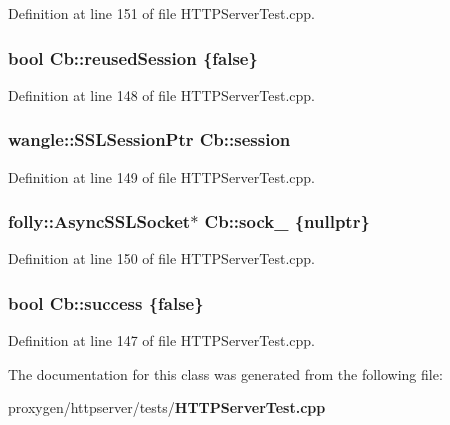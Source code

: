 Definition at line 151 of file H\+T\+T\+P\+Server\+Test.\+cpp.

\subsubsection[{reused\+Session}]{\setlength{\rightskip}{0pt plus 5cm}bool Cb\+::reused\+Session \{false\}}\label{classCb_a078f1d64998766c1d1738178e874e286}


Definition at line 148 of file H\+T\+T\+P\+Server\+Test.\+cpp.

\subsubsection[{session}]{\setlength{\rightskip}{0pt plus 5cm}wangle\+::\+S\+S\+L\+Session\+Ptr Cb\+::session}\label{classCb_a5033dda06c9fc459caa35973a60a7364}


Definition at line 149 of file H\+T\+T\+P\+Server\+Test.\+cpp.

\subsubsection[{sock\+\_\+}]{\setlength{\rightskip}{0pt plus 5cm}folly\+::\+Async\+S\+S\+L\+Socket$\ast$ Cb\+::sock\+\_\+ \{{\bf nullptr}\}}\label{classCb_a6704c20a449a287ab6fdcc90e9327569}


Definition at line 150 of file H\+T\+T\+P\+Server\+Test.\+cpp.

\subsubsection[{success}]{\setlength{\rightskip}{0pt plus 5cm}bool Cb\+::success \{false\}}\label{classCb_abfc5a7346c80efa80e729eacc856cee0}


Definition at line 147 of file H\+T\+T\+P\+Server\+Test.\+cpp.



The documentation for this class was generated from the following file\+:\begin{DoxyCompactItemize}
\item 
proxygen/httpserver/tests/{\bf H\+T\+T\+P\+Server\+Test.\+cpp}\end{DoxyCompactItemize}
